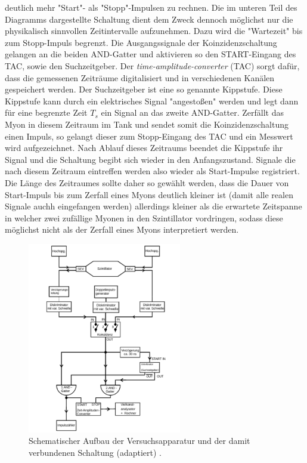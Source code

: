 deutlich mehr "Start"- als "Stopp"-Impulsen zu rechnen. Die im unteren Teil des Diagramms dargestellte Schaltung dient dem Zweck dennoch möglichst nur die physikalisch sinnvollen Zeitintervalle aufzunehmen. Dazu wird die "Wartezeit" bis zum Stopp-Impuls begrenzt. Die Ausgangssignale der Koinzidenzschaltung gelangen an die beiden AND-Gatter und aktivieren so den START-Eingang des TAC, sowie den Suchzeitgeber. Der \textit{time-amplitude-converter} (TAC) sorgt dafür, dass die gemessenen Zeiträume digitalisiert und in verschiedenen Kanälen gespeichert werden. Der Suchzeitgeber ist eine so genannte Kippstufe. Diese Kippstufe kann durch ein elektrisches Signal "angestoßen" werden und legt dann für eine begrenzte Zeit $T_s$ ein Signal an das zweite AND-Gatter. Zerfällt das Myon in diesem Zeitraum im Tank und sendet somit die Koinzidenzschaltung einen Impuls, so gelangt dieser zum Stopp-Eingang des TAC und ein Messwert wird aufgezeichnet. Nach Ablauf dieses Zeitraums beendet die Kippstufe ihr Signal und die Schaltung begibt sich wieder in den Anfangszustand. Signale die nach diesem Zeitraum eintreffen werden also wieder als Start-Impulse registriert. Die Länge des Zeitraumes sollte daher so gewählt werden, dass die Dauer von Start-Impuls bis zum Zerfall eines Myons deutlich kleiner ist (damit alle realen Signale auchh eingefangen werden) allerdings kleiner als die erwartete Zeitspanne in welcher zwei zufällige Myonen in den Szintillator vordringen, sodass diese möglichst nicht als der Zerfall eines Myons interpretiert werden.
%
\begin{figure}[htb]
  \centering
  \includegraphics[width=0.6\textwidth]{figures/versuchsaufbau_adapt.pdf}
  \caption{Schematischer Aufbau der Versuchsapparatur und der damit verbundenen Schaltung (adaptiert) \cite{V01}.}
  \label{fig:aufbau}
\end{figure}
%
